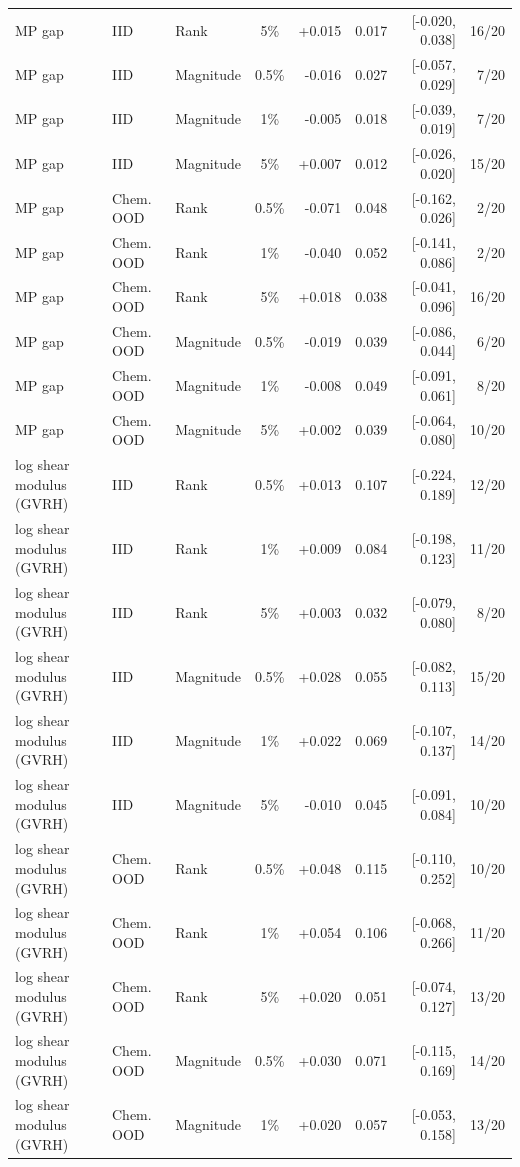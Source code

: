 \begin{longtable}{@{}lllc rrrr@{}}
MP gap & IID & Rank & 5\% & +0.015 & 0.017 & [-0.020, 0.038] & 16/20 \\
MP gap & IID & Magnitude & 0.5\% & -0.016 & 0.027 & [-0.057, 0.029] & 7/20 \\
MP gap & IID & Magnitude & 1\% & -0.005 & 0.018 & [-0.039, 0.019] & 7/20 \\
MP gap & IID & Magnitude & 5\% & +0.007 & 0.012 & [-0.026, 0.020] & 15/20 \\
MP gap & Chem. OOD & Rank & 0.5\% & -0.071 & 0.048 & [-0.162, 0.026] & 2/20 \\
MP gap & Chem. OOD & Rank & 1\% & -0.040 & 0.052 & [-0.141, 0.086] & 2/20 \\
MP gap & Chem. OOD & Rank & 5\% & +0.018 & 0.038 & [-0.041, 0.096] & 16/20 \\
MP gap & Chem. OOD & Magnitude & 0.5\% & -0.019 & 0.039 & [-0.086, 0.044] & 6/20 \\
MP gap & Chem. OOD & Magnitude & 1\% & -0.008 & 0.049 & [-0.091, 0.061] & 8/20 \\
MP gap & Chem. OOD & Magnitude & 5\% & +0.002 & 0.039 & [-0.064, 0.080] & 10/20 \\
log shear modulus (GVRH) & IID & Rank & 0.5\% & +0.013 & 0.107 & [-0.224, 0.189] & 12/20 \\
log shear modulus (GVRH) & IID & Rank & 1\% & +0.009 & 0.084 & [-0.198, 0.123] & 11/20 \\
log shear modulus (GVRH) & IID & Rank & 5\% & +0.003 & 0.032 & [-0.079, 0.080] & 8/20 \\
log shear modulus (GVRH) & IID & Magnitude & 0.5\% & +0.028 & 0.055 & [-0.082, 0.113] & 15/20 \\
log shear modulus (GVRH) & IID & Magnitude & 1\% & +0.022 & 0.069 & [-0.107, 0.137] & 14/20 \\
log shear modulus (GVRH) & IID & Magnitude & 5\% & -0.010 & 0.045 & [-0.091, 0.084] & 10/20 \\
log shear modulus (GVRH) & Chem. OOD & Rank & 0.5\% & +0.048 & 0.115 & [-0.110, 0.252] & 10/20 \\
log shear modulus (GVRH) & Chem. OOD & Rank & 1\% & +0.054 & 0.106 & [-0.068, 0.266] & 11/20 \\
log shear modulus (GVRH) & Chem. OOD & Rank & 5\% & +0.020 & 0.051 & [-0.074, 0.127] & 13/20 \\
log shear modulus (GVRH) & Chem. OOD & Magnitude & 0.5\% & +0.030 & 0.071 & [-0.115, 0.169] & 14/20 \\
log shear modulus (GVRH) & Chem. OOD & Magnitude & 1\% & +0.020 & 0.057 & [-0.053, 0.158] & 13/20 \\

\end{longtable}
